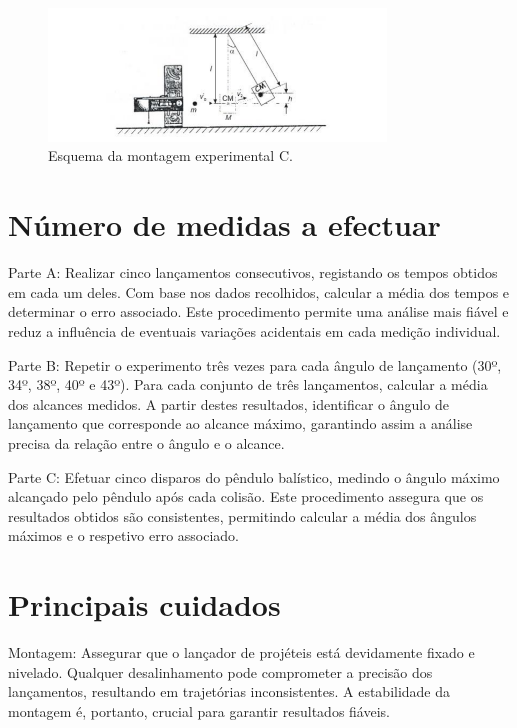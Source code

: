 \documentclass{report}
\begin{document}
\begin{figure}[H]
    \centering
    \includegraphics[width=0.8\textwidth]{image3.png} %
    \caption{Esquema da montagem experimental C.}
    \label{fig:montagem}
\end{figure}

\section{Número de medidas a efectuar}  %
Parte A: Realizar cinco lançamentos consecutivos, registando os tempos obtidos em cada um deles. Com base nos dados recolhidos, calcular a média dos tempos e determinar o erro associado. Este procedimento permite uma análise mais fiável e reduz a influência de eventuais variações acidentais em cada medição individual.

Parte B: Repetir o experimento três vezes para cada ângulo de lançamento (30º, 34º, 38º, 40º e 43º). Para cada conjunto de três lançamentos, calcular a média dos alcances medidos. A partir destes resultados, identificar o ângulo de lançamento que corresponde ao alcance máximo, garantindo assim a análise precisa da relação entre o ângulo e o alcance.

Parte C: Efetuar cinco disparos do pêndulo balístico, medindo o ângulo máximo alcançado pelo pêndulo após cada colisão. Este procedimento assegura que os resultados obtidos são consistentes, permitindo calcular a média dos ângulos máximos e o respetivo erro associado.

\section{Principais cuidados}

Montagem: Assegurar que o lançador de projéteis está devidamente fixado e nivelado. Qualquer desalinhamento pode comprometer a precisão dos lançamentos, resultando em trajetórias inconsistentes. A estabilidade da montagem é, portanto, crucial para garantir resultados fiáveis.
\end{document}

